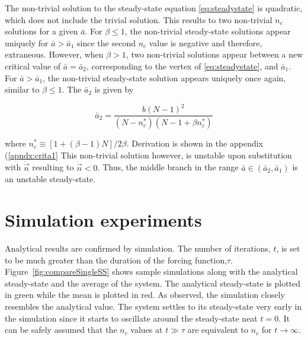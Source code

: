 The non-trivial solution to the steady-state equation \eqref{eq:steadystate} is quadratic, which does not include the trivial solution.
This results to two non-trivial $n_{c}$ solutions for a given $\bar{a}$.
For $\beta\leq1$, the non-trivial steady-state solutions appear uniquely for $\bar{a}>\bar{a}_{1}$ since the second $n_{c}$ value is negative and therefore, extraneous.
However, when $\beta>1$, two non-trivial solutions appear between a new critical value of $\bar{a}=\bar{a}_{2}$, corresponding to the vertex of \eqref{eq:steadystate}, and $\bar{a}_{1}$.
For $\bar{a}>\bar{a}_{1}$, the non-trivial steady-state solution appears uniquely once again, similar to $\beta\leq1$.
The $\bar{a}_{2}$ is given by

\begin{equation}
\bar{a}_{2} = \frac{b(N-1)^{2}}{(N-n_{c}^{*})(N-1+\beta n_{c}^{*})}
\end{equation}

where $n_{c}^{*} \equiv [1+(\beta-1)N]/2\beta$.
Derivation is shown in the appendix (\ref{apndx:crita1}
This non-trivial solution however, is unstable upon substitution with $\ddot{\vec{n}}$ resulting to $\ddot{\vec{n}}<0$.
Thus, the middle branch in the range $\bar{a}\in(\bar{a}_{2},\bar{a}_{1})$ is an unstable steady-state.
 
\section{Simulation experiments}
\hspace{\parindent} Analytical results are confirmed by simulation. The number of iterations, $t$, is set to be much greater than the duration of the forcing function,$\tau$.
Figure~\ref{fig:compareSingleSS} shows sample simulations along with the analytical steady-state and the average of the system.
The analytical steady-state is plotted in green while the mean is plotted in red.
As observed, the simulation closely resembles the analytical value. 
The system settles to its steady-state very early in the simulation since it starts to oscillate around the steady-state neat $t = 0$.
It can be safely assumed that the $n_{c}$ values at $t \gg \tau$ are equivalent to $n_{c}$ for $t \rightarrow \infty$.

